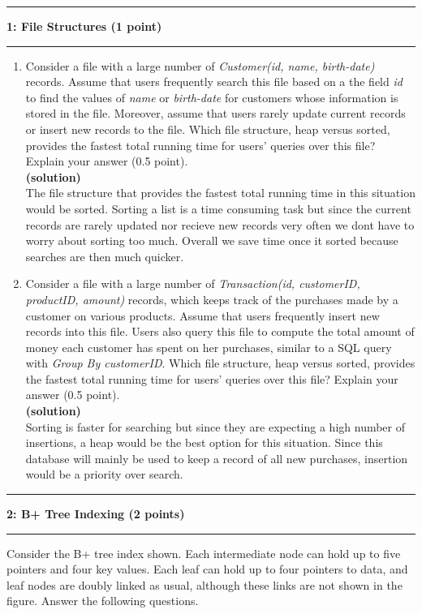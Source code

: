 \documentclass[11pt]{article}
\newcommand\question[2]{\vspace{.25in}\hrule\textbf{#1: #2}\vspace{.5em}\hrule\vspace{.10in}}
\renewcommand\part[1]{\vspace{.10in}\textbf{(#1)}}
\begin{document}
\question{1}{File Structures (1 point)}
\begin{enumerate}
\item Consider a file with a large number of \textit{Customer(id, name, birth-date)} records. Assume that users frequently search this file based on a the field \textit{id} to find the values of \textit{name} or \textit{birth-date} for customers whose information is stored in the file. Moreover, assume that users rarely update current records or insert new records to the file. Which file structure, heap versus sorted, provides the fastest total running time for users' queries over this file? Explain your answer (0.5 point).\\
\part{solution}\\
The file structure that provides the fastest total running time in this situation would be sorted. Sorting a list is a time consuming task but since the current records are rarely updated nor recieve new records very often we dont have to worry about sorting too much. Overall we save time once it sorted because searches are then much quicker.


\item Consider a file with a large number of \textit{Transaction(id, customerID, productID, amount)} records, which keeps track of the purchases made by a customer on various products. Assume that users frequently insert new records into this file. Users also query this file to compute the total amount of money each customer has spent on her purchases, similar to a SQL query with {\it Group By customerID}. Which file structure, heap versus sorted, provides the fastest total running time for users' queries over this file?  Explain your answer (0.5 point).\\
\part{solution}\\
Sorting is faster for searching but since they are expecting a high number of insertions, a heap would be the best option for this situation. Since this database will mainly be used to keep a record of all new purchases, insertion would be a priority over search.

\end{enumerate}


\question{2}{B+ Tree Indexing (2 points)}
Consider the B+ tree index shown.
Each intermediate node can hold up to five pointers and four key values. Each leaf can hold up to four pointers to data, and leaf nodes are doubly linked as usual, although these links are not shown in the figure.
Answer the following questions.
\end{document}
